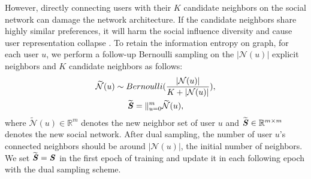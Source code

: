 \documentclass[letterpaper]{article} %
\begin{document}
However, directly connecting users with their $K$ candidate neighbors on the social network can damage the network architecture. If the candidate neighbors share highly similar preferences, it will harm the social influence diversity and cause user representation collapse \cite{collapse}. To retain the information entropy on graph, for each user $u$, we perform a follow-up Bernoulli sampling on the $|\mathcal{N}(u)|$ explicit neighbors and $K$ candidate neighbors as follows:
\begin{gather}
    \widetilde{\mathcal{N}}(u) \sim Bernoulli(\frac{|\mathcal{N}(u)|}{K+|\mathcal{N}(u)|}),\\
    \widetilde{\textbf{\textit{S}}} = \mathbin\Vert_{u=0}^{m}\widetilde{\mathcal{N}}(u),
\end{gather}
where $\widetilde{\mathcal{N}}(u) \in \mathbb{R}^{m}$ denotes the new neighbor set of user $u$ and  $\widetilde{\textbf{\textit{S}}} \in \mathbb{R}^{m\times m}$ denotes the new social network. After dual sampling, the number of user $u$'s connected neighbors should be around $|\mathcal{N}(u)|$, the initial number of neighbors. We set $\widetilde{\textbf{\textit{S}}}=\textbf{\textit{S}}$ in the first epoch of training and update it in each following epoch with the dual sampling scheme.
\end{document}
